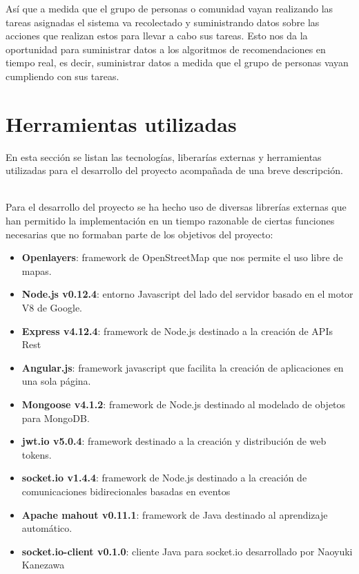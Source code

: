 Así que a medida que el grupo de personas o comunidad vayan realizando las tareas asignadas el sistema va recolectado y suministrando datos sobre las acciones que realizan estos para llevar a cabo sus tareas. Esto nos da la oportunidad para suministrar datos a los algoritmos de recomendaciones en tiempo real, es decir, suministrar datos a medida que el grupo de personas vayan cumpliendo con sus tareas.

\section{Herramientas utilizadas}

En esta sección se listan las tecnologías, liberarías externas y herramientas utilizadas para el desarrollo del proyecto acompañada de una breve descripción.

\\

Para el desarrollo del proyecto se ha hecho uso de diversas librerías externas que han permitido la implementación en un tiempo razonable de ciertas funciones necesarias que no formaban parte de los objetivos del proyecto:

\begin{itemize}
       \item {\bfseries Openlayers}: framework de OpenStreetMap que nos permite el uso libre de mapas.
       \item {\bfseries Node.js v0.12.4}: entorno Javascript del lado del servidor basado en el motor V8 de Google. 
       \item {\bfseries Express v4.12.4}: framework de Node.js destinado a la creación de APIs Rest
       \item {\bfseries Angular.js}: framework javascript que facilita la creación de aplicaciones en una sola página. 
       \item {\bfseries Mongoose v4.1.2}: framework de Node.js destinado al modelado de objetos para MongoDB.
       \item {\bfseries jwt.io v5.0.4}: framework destinado a la creación y distribución de web tokens. 
       \item {\bfseries socket.io v1.4.4}: framework de Node.js destinado a la creación de comunicaciones bidirecionales basadas en eventos
       \item {\bfseries Apache mahout v0.11.1}: framework de Java destinado al aprendizaje automático.
       \item {\bfseries socket.io-client v0.1.0}: cliente Java para socket.io desarrollado por Naoyuki Kanezawa
\end{itemize}

